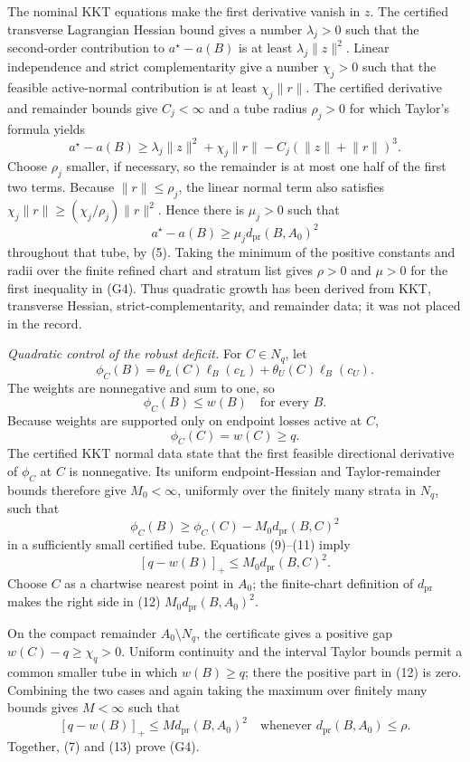 The nominal KKT equations make the first derivative vanish in \(z\).  The certified transverse Lagrangian Hessian bound gives a number \(\lambda_j>0\) such that the second-order contribution to \(a^\star-a(B)\) is at least \(\lambda_j\lVert z\rVert^2\).  Linear independence and strict complementarity give a number \(\chi_j>0\) such that the feasible active-normal contribution is at least \(\chi_j\lVert r\rVert\).  The certified derivative and remainder bounds give \(C_j<\infty\) and a tube radius \(\rho_j>0\) for which Taylor's formula yields
\[
a^\star-a(B)
\ge\lambda_j\lVert z\rVert^2+\chi_j\lVert r\rVert
-C_j(\lVert z\rVert+\lVert r\rVert)^3.
\tag{6}
\]
Choose \(\rho_j\) smaller, if necessary, so the remainder is at most one half of the first two terms.  Because \(\lVert r\rVert\le\rho_j\), the linear normal term also satisfies
\(\chi_j\lVert r\rVert\ge(\chi_j/\rho_j)\lVert r\rVert^2\).  Hence there is \(\mu_j>0\) such that
\[
a^\star-a(B)\ge\mu_j d_{\mathrm{pr}}(B,A_0)^2
\tag{7}
\]
throughout that tube, by (5).  Taking the minimum of the positive constants and radii over the finite refined chart and stratum list gives \(\rho>0\) and \(\mu>0\) for the first inequality in (G4).  Thus quadratic growth has been derived from KKT, transverse Hessian, strict-complementarity, and remainder data; it was not placed in the record.

\emph{Quadratic control of the robust deficit.}
For \(C\in N_q\), let
\[
\phi_C(B)=\theta_L(C)\ell_B(c_L)+\theta_U(C)\ell_B(c_U).
\tag{8}
\]
The weights are nonnegative and sum to one, so
\[
\phi_C(B)\le w(B)
\quad\text{for every }B.
\tag{9}
\]
Because weights are supported only on endpoint losses active at \(C\),
\[
\phi_C(C)=w(C)\ge q.
\tag{10}
\]
The certified KKT normal data state that the first feasible directional derivative of \(\phi_C\) at \(C\) is nonnegative.  Its uniform endpoint-Hessian and Taylor-remainder bounds therefore give \(M_0<\infty\), uniformly over the finitely many strata in \(N_q\), such that
\[
\phi_C(B)\ge\phi_C(C)-M_0d_{\mathrm{pr}}(B,C)^2
\tag{11}
\]
in a sufficiently small certified tube.  Equations (9)--(11) imply
\[
[q-w(B)]_+\le M_0d_{\mathrm{pr}}(B,C)^2.
\tag{12}
\]
Choose \(C\) as a chartwise nearest point in \(A_0\); the finite-chart definition of \(d_{\mathrm{pr}}\) makes the right side in (12) \(M_0d_{\mathrm{pr}}(B,A_0)^2\).

On the compact remainder \(A_0\setminus N_q\), the certificate gives a positive gap \(w(C)-q\ge\chi_q>0\).  Uniform continuity and the interval Taylor bounds permit a common smaller tube in which \(w(B)\ge q\); there the positive part in (12) is zero.  Combining the two cases and again taking the maximum over finitely many bounds gives \(M<\infty\) such that
\[
[q-w(B)]_+\le Md_{\mathrm{pr}}(B,A_0)^2
\quad\text{whenever }d_{\mathrm{pr}}(B,A_0)\le\rho.
\tag{13}
\]
Together, (7) and (13) prove (G4).

